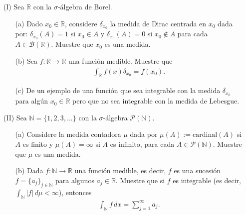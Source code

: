 \begin{enumerate}
    \item[(I)] Sea $\mathbb{R}$ con la $\sigma$-álgebra de Borel.
    \begin{enumerate}
        \item[(a)] Dado $x_0\in \mathbb{R}$, considere $\delta_{x_0}$ la medida de Dirac centrada en $x_0$ dada por: $\delta_{x_0}(A)=1$ si $x_0\in A$ y $\delta_{x_0}(A)=0$ si $x_0\notin A$ para cada $A\in \mathcal{B}(\mathbb{R})$. Muestre que $x_0$ es una medida.
        \item[(b)] Sea $f:\mathbb{R}\to \mathbb{R}$ una función medible. Muestre que 
        \begin{align*}
            \int_{\mathbb{R}}f(x)\delta_{x_0}=f(x_0).
        \end{align*}
        \item[(c)] De un ejemplo de una función que sea integrable con la medida $\delta_{x_0}$ para algún $x_0\in \mathbb{R}$ pero que no sea integrable con la medida de Lebesgue.
    \end{enumerate}
    \item[(II)] Sea $\mathbb{N}=\{1,2,3,...\}$ con la $\sigma$-álgebra $\mathcal{P}(\mathbb{N})$.
    \begin{enumerate}
        \item[(a)] Considere la medida contadora $\mu$ dada por $\mu(A):=\text{cardinal}(A)$ si $A$ es finito y $\mu(A)=\infty$ si $A$ es infinito, para cada $A \in \mathcal{P}(\mathbb{N})$. Muestre que $\mu$ es una medida.
        \item[(b)] Dada $f:\mathbb{N}\to \mathbb{R}$ una función medible, es decir, $f$ es una sucesión $f=\{a_j\}_{j\in \mathbb{N}}$ para algunos $a_j\in \mathbb{R}$. Muestre que si $f$ es integrable (es decir, $\displaystyle \int_{\mathbb{N}}|f|\, d\mu<\infty$), entonces
        \begin{align*}
            \int_{\mathbb{N}}f\, dx=\sum_{j=1}^\infty a_j.
        \end{align*}
    \end{enumerate}
\end{enumerate}

